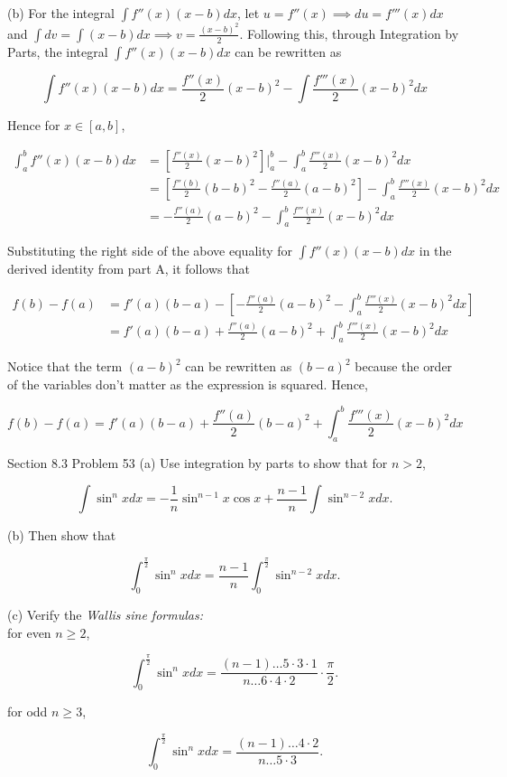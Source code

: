 \documentclass{article}
\begin{document}
    (b) For the integral $\int f''(x)(x-b)dx$, let $u=f''(x)\implies du=f'''(x)dx$ and $\int dv=\int (x-b)dx\implies v= \frac{(x-b)^2}{2}$. Following this, through Integration by Parts, the integral $\int f''(x)(x-b)dx$
    can be rewritten as

    \[
        \int f''(x)(x-b)dx = \frac{f''(x)}{2}(x-b)^2 - \int \frac{f'''(x)}{2}(x-b)^{2}dx
    \]

    Hence for $x\in[a,b]$,

    \begin{align*}
        \int_a^b f''(x)(x-b)dx  &= \left[\frac{f''(x)}{2}(x-b)^2\right]\Big|_a^b-\int_a^b \frac{f'''(x)}{2}(x-b)^2 dx \\
                                &= \left[\frac{f''(b)}{2}(b-b)^2-\frac{f''(a)}{2}(a-b)^2\right] - \int_a^b \frac{f'''(x)}{2}(x-b)^2 dx \\
                                &= -\frac{f''(a)}{2}(a-b)^2-\int_a^b \frac{f'''(x)}{2}(x-b)^2 dx
    \end{align*}

    Substituting the right side of the above equality for $\int f''(x)(x-b)dx$ in the derived identity from part A, it follows that

    \begin{align*}
        f(b) - f(a) &= f'(a)(b-a) - \left[-\frac{f''(a)}{2}(a-b)^2-\int_a^b \frac{f'''(x)}{2}(x-b)^2 dx\right] \\
                    &= f'(a)(b-a) + \frac{f''(a)}{2}(a-b)^2 + \int_a^b \frac{f'''(x)}{2}(x-b)^2 dx
    \end{align*}

    Notice that the term $(a-b)^2$ can be rewritten as $(b-a)^{2}$ because the order of the variables don't matter as the expression is squared. Hence,

    \[
        f(b) - f(a) = f'(a)(b-a) + \frac{f''(a)}{2}(b-a)^2 + \int_a^b \frac{f'''(x)}{2}(x-b)^2 dx
    \]

    \pagebreak
    \thispagestyle{6}


    \begin{tbhtheorem}{Section 8.3 Problem 53}
        (a) Use integration by parts to show that for $n>2$,

        \[
            \int \sin^n{x}dx = -\frac{1}{n}\sin^{n-1}{x} \cos{x} + \frac{n-1}{n}\int\sin^{n-2}{x}dx.
        \]

        (b) Then show that

        \[
            \int_0^{\frac{\pi}{2}}\sin^n{x}dx = \frac{n-1}{n} \int_0^{\frac{\pi}{2}}\sin^{n-2}{x}dx.
        \]

        (c) Verify the \textit{Wallis sine formulas:} \\
        for even $n\geq 2$,

        \[
            \int_0^{\frac{\pi}{2}}\sin^n{x}dx = \frac{(n-1)\dots5\cdot3\cdot1}{n\dots6\cdot4\cdot2}\cdot\frac{\pi}{2}.
        \]

        for odd $n\geq 3$,

        \[
            \int_{0}^{\frac{\pi}{2}} \sin^n{x}dx = \frac{(n-1)\dots4\cdot2}{n\dots5\cdot3}.
        \]
    \end{tbhtheorem}
\end{document}
